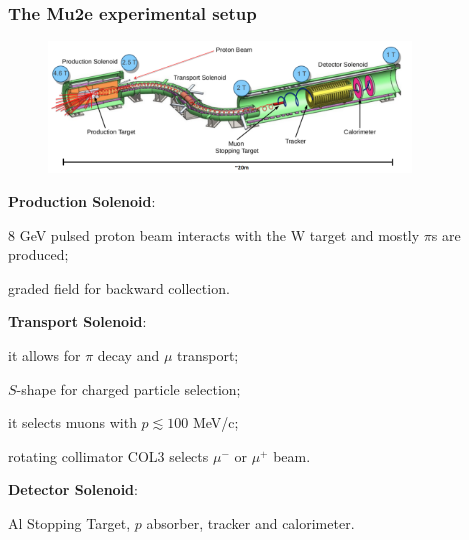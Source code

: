 \documentclass{beamer}
\begin{document}
\begin{frame}
    \frametitle{The Mu2e experimental setup}
    \vspace{-7mm}
     \begin{figure}[h!]
            \centering
            \hspace*{-4ex}
            \includegraphics[width=1.1\framewidth, height=3.5cm]{figures/png/Screenshot_20240913_162936.png}
        \end{figure}
                \setlength{\leftmargini}{-0.5em}
\vspace{-2mm}
        \begin{itemize}
        {\footnotesize
            \item \textbf{Production Solenoid}:}
            \begin{itemize}
                {\footnotesize  \item 8 GeV pulsed proton beam interacts with the W target and mostly $\pi$s are produced;
                \item graded field for backward collection.}
            \end{itemize}
            {\footnotesize \item \textbf{Transport Solenoid}:}
            \begin{itemize}
                {\footnotesize \item it allows for $\pi$ decay and $\mu$ transport;
                \item $S$-shape for charged particle selection;
                \item it selects muons with $p \lesssim 100 $ MeV/c;
                \item rotating collimator COL3 selects $\mu^-$ or $\mu^+$ beam.}
            \end{itemize}
\item  {\footnotesize \textbf{Detector Solenoid}: } 
\begin{itemize}
    {\footnotesize  \item Al Stopping Target, $p$ absorber, tracker and calorimeter.}
\end{itemize}
        \end{itemize}
\end{frame}
\end{document}
